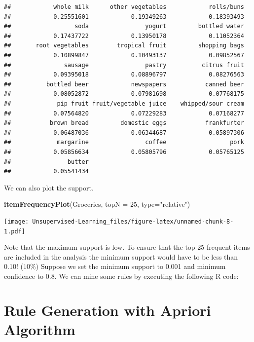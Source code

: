 \documentclass[
]{book}
\newenvironment{Shaded}{\begin{snugshade}}{\end{snugshade}}
\newcommand{\DataTypeTok}[1]{\textcolor[rgb]{0.13,0.29,0.53}{#1}}
\newcommand{\DecValTok}[1]{\textcolor[rgb]{0.00,0.00,0.81}{#1}}
\newcommand{\KeywordTok}[1]{\textcolor[rgb]{0.13,0.29,0.53}{\textbf{#1}}}
\newcommand{\NormalTok}[1]{#1}
\newcommand{\StringTok}[1]{\textcolor[rgb]{0.31,0.60,0.02}{#1}}
\begin{document}
\begin{verbatim}
##            whole milk      other vegetables            rolls/buns 
##            0.25551601            0.19349263            0.18393493 
##                  soda                yogurt         bottled water 
##            0.17437722            0.13950178            0.11052364 
##       root vegetables        tropical fruit         shopping bags 
##            0.10899847            0.10493137            0.09852567 
##               sausage                pastry          citrus fruit 
##            0.09395018            0.08896797            0.08276563 
##          bottled beer            newspapers           canned beer 
##            0.08052872            0.07981698            0.07768175 
##             pip fruit fruit/vegetable juice    whipped/sour cream 
##            0.07564820            0.07229283            0.07168277 
##           brown bread         domestic eggs           frankfurter 
##            0.06487036            0.06344687            0.05897306 
##             margarine                coffee                  pork 
##            0.05856634            0.05805796            0.05765125 
##                butter 
##            0.05541434
\end{verbatim}

We can also plot the support.

\begin{Shaded}
\begin{Highlighting}[]
\KeywordTok{itemFrequencyPlot}\NormalTok{(Groceries, }\DataTypeTok{topN =} \DecValTok{25}\NormalTok{, }\DataTypeTok{type=}\StringTok{"relative"}\NormalTok{)}
\end{Highlighting}
\end{Shaded}

\texttt{[image: Unsupervised-Learning\_files/figure-latex/unnamed-chunk-8-1.pdf]}

Note that the maximum support is low. To ensure that the top 25 frequent items are included in the analysis the minimum support would have to be less than 0.10! (\(10\%\)) Suppose we set the minimum support to 0.001 and minimum confidence to 0.8. We can mine some rules by executing the following R code:

\hypertarget{rule-generation-with-apriori-algorithm}{%
\section{Rule Generation with Apriori Algorithm}\label{rule-generation-with-apriori-algorithm}}
\end{document}
